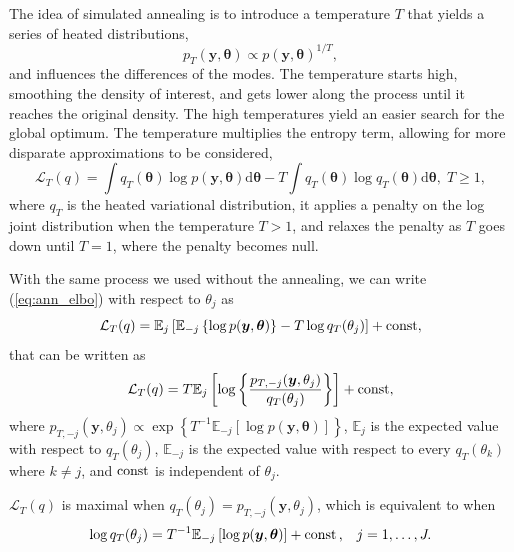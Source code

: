 \documentclass[a4paper, 11pt]{report}
\numberwithin{equation}{chapter}
\DeclareMathOperator*{\const}{{\rm const}}
\begin{document}
The idea of simulated annealing is to introduce a temperature $T$ that yields a series of heated distributions,
\begin{equation*}
p_T(\boldsymbol{y},\boldsymbol{\theta}) \propto p(\boldsymbol{y},\boldsymbol{\theta})^{1/T},
\end{equation*}
and influences the differences of the modes. The temperature starts high, smoothing the density of interest, and gets lower along the process until it reaches the original density. The high temperatures yield an easier search for the global optimum. The temperature multiplies the entropy term, allowing for more disparate approximations to be considered,
\begin{equation}
\mathcal{L}_T(q) = \int q_T(\boldsymbol{\theta}) \log p(\boldsymbol{y},\boldsymbol{\theta})\mathrm{d}\boldsymbol{\theta} - T \int q_T(\boldsymbol{\theta}) \log q_T(\boldsymbol{\theta}) \mathrm{d}\boldsymbol{\theta},\; T\geq 1,
\label{eq:ann_elbo}
\end{equation}
where $q_T$ is the heated variational distribution, it applies a penalty on the log joint distribution when the temperature $T > 1$, and relaxes the penalty as $T$ goes down until $T = 1$, where the penalty becomes null.

With the same process we used without the annealing, we can write (\ref{eq:ann_elbo}) with respect to $\theta_j$ as
\begin{equation*}
\mathcal{L}_T(q) = \mathbb{E}_j\left[\mathbb{E}_{-j}\left\lbrace \log p(\boldsymbol{y},\boldsymbol{\theta})\right\rbrace - T \log q_T(\theta_j)\right]+ \const,
\end{equation*}
that can be written as
\begin{equation*}
\mathcal{L}_T(q) = T\mathbb{E}_j\left[\log\left\lbrace\frac{p_{T, -j}(\boldsymbol{y}, \theta_j)}{q_T(\theta_j)}\right\rbrace\right] + \const,	
\end{equation*}
where $p_{T, -j}(\boldsymbol{y},\theta_j) \propto \exp\left\lbrace T^{-1}\mathbb{E}_{-j}\left[\log p(\boldsymbol{y},\boldsymbol{\theta})\right]\right\rbrace$, $\mathbb{E}_j$ is the expected value with respect to $q_T(\theta_j)$, $\mathbb{E}_{-j}$ is the expected value with respect to every $ q_T(\theta_k)$ where $k \neq j$, and $\const$ is independent of $\theta_j$.

$\mathcal{L}_T(q)$ is maximal when $q_T(\theta_j) = p_{T,-j}(\boldsymbol{y},\theta_j)$, which is equivalent to when
\begin{equation*}
\log q_T(\theta_j) = T^{-1} \mathbb{E}_{-j}\left[\log p(\boldsymbol{y}, \boldsymbol{\theta})\right] + \const\text{,}\quad j=1,\dots,J.
\end{equation*}
\end{document}
